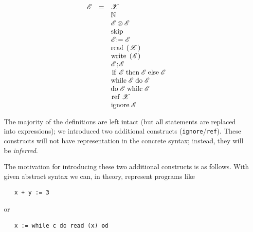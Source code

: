 \documentclass{article}
\newcommand{\llang}[1]{\mbox{\lstinline[mathescape]|#1|}}
\theoremstyle{definition}
\begin{document}
\[
\begin{array}{rcl}
   \mathscr E & = & \mathscr X                                                            \\
              &   & \mathbb N                                                             \\
              &   & \mathscr E \otimes \mathscr E                                         \\
              &   & \mbox{\lstinline|skip|}                                               \\
              &   & \mathscr E \mbox{\lstinline|:=|} \;\mathscr E                         \\
              &   & \mbox{\lstinline|read (|} \mathscr X \mbox{\lstinline|)|}             \\
              &   & \mbox{\lstinline|write (|} \mathscr E \mbox{\lstinline|)|}            \\
              &   & \mathscr E \mbox{\lstinline|;|} \mathscr E                            \\
              &   & \llang{if $\;\mathscr E\;$ then $\;\mathscr E\;$ else $\;\mathscr E$} \\
              &   & \llang{while $\;\mathscr E\;$ do $\;\mathscr E$}                      \\
              &   & \llang{do $\;\mathscr E\;$ while $\;\mathscr E$}                  \\
              &   & \llang{ref $\;\mathscr X$}                                            \\
              &   & \llang{ignore $\;\mathscr E$}
\end{array}
\]

The majority of the definitions are left intact (but all statements are replaced into expressions); we introduced two additional
constructs (\llang{ignore}/\llang{ref}). These constructs will not have representation in the concrete syntax; instead, they will be
\emph{inferred}.

The motivation for introducing these two additional constructs is as follows. With given abstract syntax we can, in theory, represent programs like

\begin{lstlisting}
   x + y := 3
\end{lstlisting}

or

\begin{lstlisting}
   x := while c do read (x) od
\end{lstlisting}
\end{document}
